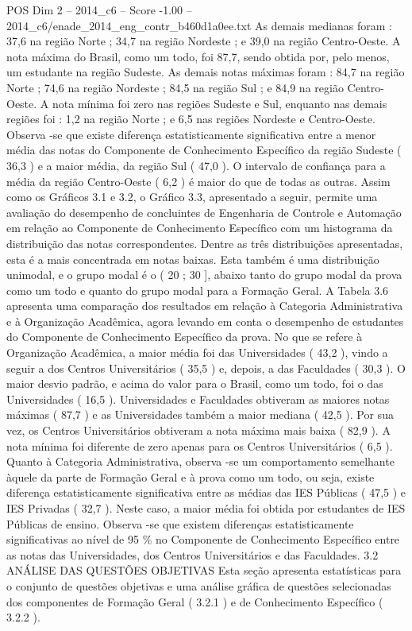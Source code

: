 \begin{textsample}{POS Dim 2 – 2014\_c6 – Score -1.00 – 2014\_c6/enade\_2014\_eng\_contr\_b460d1a0ee.txt}
As demais medianas foram : 37,6 na região Norte ; 34,7 na região Nordeste ; e 39,0 na região Centro-Oeste.
A nota máxima do Brasil, como um todo, foi 87,7, sendo obtida por, pelo menos, um estudante na região Sudeste.
As demais notas máximas foram : 84,7 na região Norte ; 74,6 na região Nordeste ; 84,5 na região Sul ; e 84,9 na região Centro-Oeste.
A nota mínima foi zero nas regiões Sudeste e Sul, enquanto nas demais regiões foi : 1,2 na região Norte ; e 6,5 nas regiões Nordeste e Centro-Oeste.
Observa -se que existe diferença estatisticamente significativa entre a menor média das notas do Componente de Conhecimento Específico da região Sudeste ( 36,3 ) e a maior média, da região Sul ( 47,0 ).
O intervalo de confiança para a média da região Centro-Oeste ( 6,2 ) é maior do que de todas as outras.
Assim como os Gráficos 3.1 e 3.2, o Gráfico 3.3, apresentado a seguir, permite uma avaliação do desempenho de concluintes de Engenharia de Controle e Automação em relação ao Componente de Conhecimento Específico com um histograma da distribuição das notas correspondentes.
Dentre as três distribuições apresentadas, esta é a mais concentrada em notas baixas.
Esta também é uma distribuição unimodal, e o grupo modal é o ( 20 ; 30 ], abaixo tanto do grupo modal da prova como um todo e quanto do grupo modal para a Formação Geral.
A Tabela 3.6 apresenta uma comparação dos resultados em relação à Categoria Administrativa e à Organização Acadêmica, agora levando em conta o desempenho de estudantes do Componente de Conhecimento Específico da prova.
No que se refere à Organização Acadêmica, a maior média foi das Universidades ( 43,2 ), vindo a seguir a dos Centros Universitários ( 35,5 ) e, depois, a das Faculdades ( 30,3 ).
O maior desvio padrão, e acima do valor para o Brasil, como um todo, foi o das Universidades ( 16,5 ).
Universidades e Faculdades obtiveram as maiores notas máximas ( 87,7 ) e as Universidades também a maior mediana ( 42,5 ).
Por sua vez, os Centros Universitários obtiveram a nota máxima mais baixa ( 82,9 ).
A nota mínima foi diferente de zero apenas para os Centros Universitários ( 6,5 ).
Quanto à Categoria Administrativa, observa -se um comportamento semelhante àquele da parte de Formação Geral e à prova como um todo, ou seja, existe diferença estatisticamente significativa entre as médias das IES Públicas ( 47,5 ) e IES Privadas ( 32,7 ).
Neste caso, a maior média foi obtida por estudantes de IES Públicas de ensino.
Observa -se que existem diferenças estatisticamente significativas ao nível de 95 \% no Componente de Conhecimento Específico entre as notas das Universidades, dos Centros Universitários e das Faculdades. 3.2 ANÁLISE DAS QUESTÕES OBJETIVAS Esta seção apresenta estatísticas para o conjunto de questões objetivas e uma análise gráfica de questões selecionadas dos componentes de Formação Geral ( 3.2.1 ) e de Conhecimento Específico ( 3.2.2 ).

\end{textsample}
